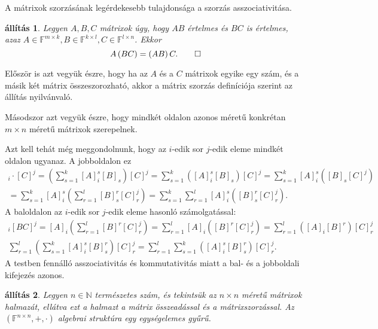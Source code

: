 \documentclass[9pt, showtrims]{memoir}
\makeatletter
\renewenvironment{proof}[1][\proofname]
    {\par\pushQED{\qed}%
    \normalfont \topsep6\p@\@plus6\p@\relax
    \trivlist
    \item[\hskip\labelsep
        \itshape
    #1\@addpunct{:}]\ignorespaces}
    {\popQED\endtrivlist\@endpefalse}
\theoremstyle{plain}
\newtheorem{proposition}{állítás}[section]
\theoremstyle{remark}
\theoremstyle{definition}
\renewcommand{\mathbf}{\mathbb}
\makeatother
\begin{document}
A mátrixok szorzásának legérdekesebb tulajdonsága a szorzás asszociativitása.
\begin{proposition}
    Legyen $A,B,C$ mátrixok úgy, hogy $AB$ értelmes és $BC$ is értelmes, 
    azaz $A\in\mathbf{F}^{m\times k},B\in\mathbf{F}^{k\times l}, C\in\mathbf{F}^{l\times n}$.
    Ekkor
    \[
        A\left( BC \right)=\left( AB \right)C.\qedhere
    \]
\end{proposition}
\begin{proof}
    Először is azt vegyük észre, 
    hogy ha az $A$ és a $C$ mátrixok egyike egy szám, 
    és a másik két mátrix összeszorozható, 
    akkor a mátrix szorzás definíciója szerint az állítás nyilvánvaló.

    Másodszor azt vegyük észre, hogy mindkét oldalon azonos méretű 
    konkrétan $m\times n$ méretű mátrixok szerepelnek.

    Azt kell tehát még meggondolnunk,
    hogy az $i$-edik sor $j$-edik eleme mindkét oldalon ugyanaz.
    A jobboldalon ez
    \begin{multline*}
        [AB]_i\cdot [C]^j
        =
        \left( \sum_{s=1}^k[A]_i^s[B]_s \right)[C]^j
        =
        \sum_{s=1}^k\left([A]_i^s[B]_s\right)[C]^j
        =
        \sum_{s=1}^k[A]_i^s\left([B]_s[C]^j\right)
        \\
        =
        \sum_{s=1}^k[A]_i^s\left(\sum_{r=1}^l[B]_s^r[C]_r^j\right)
        =
        \sum_{s=1}^k\sum_{r=1}^l[A]_i^s([B]_s^r[C]_r^j).
    \end{multline*}
    A baloldalon
    az $i$-edik sor $j$-edik eleme hasonló számolgatással:
    \begin{multline*}
        [A]_i[BC]^j=
        [A]_i\left( \sum_{r=1}^l[B]^r[C]_r^j \right)
        =
        \sum_{r=1}^l[A]_i\left([B]^r[C]_r^j\right)
        =
        \sum_{r=1}^l\left([A]_i[B]^r\right)[C]_r^j
        \\
        \sum_{r=1}^l\left(\sum_{s=1}^k[A]_i^s[B]_s^r\right)[C]_r^j
        =
        \sum_{r=1}^l\sum_{s=1}^k\left([A]_i^s[B]_s^r\right)[C]_r^j.
    \end{multline*}
    A testben fennálló asszociativitás és kommutativitás miatt a bal- és a jobboldali kifejezés azonos.
\end{proof}
\begin{proposition}
    Legyen $n\in\mathbf{N}$ természetes szám, és tekintsük az $n\times n$ méretű mátrixok
    halmazát, ellátva ezt a halmazt a mátrix összeadással és a mátrixszorzással.
    Az $\left( \mathbf{F}^{n\times n},+,\cdot \right)$ algebrai struktúra egy egységelemes gyűrű.
\end{proposition}
\end{document}
